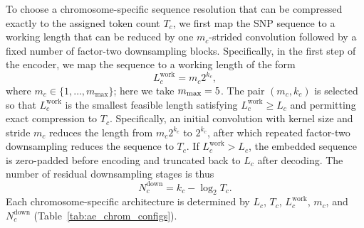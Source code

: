 \documentclass{article}
\begin{document}
To choose a chromosome-specific sequence resolution that can be compressed exactly to the assigned token count \(T_c\), we first map the SNP sequence to a working length that can be reduced by one \(m_c\)-strided convolution followed by a fixed number of factor-two downsampling blocks. Specifically, in the first step of the encoder, we map the sequence to a working length of the form
\[
L_c^{\mathrm{work}} = m_c 2^{k_c},
\]
where \(m_c \in \{1,\ldots,m_{\max}\}\); here we take \(m_{\rm max} = 5\). 
The pair \((m_c,k_c)\) is selected so that \(L_c^{\mathrm{work}}\) is the smallest feasible length satisfying \(L_c^{\mathrm{work}}\ge L_c\) and permitting exact compression to \(T_c\). Specifically, an initial convolution with kernel size and stride \(m_c\) reduces the length from \(m_c2^{k_c}\) to \(2^{k_c}\), after which repeated factor-two downsampling reduces the sequence to \(T_c\). If \(L_c^{\mathrm{work}}>L_c\), the embedded sequence is zero-padded before encoding and truncated back to \(L_c\) after decoding. The number of residual downsampling stages is thus
\[
N_c^{\mathrm{down}} = k_c-\log_2 T_c.
\]
Each chromosome-specific architecture is determined by \(L_c\), \(T_c\), \(L_c^{\mathrm{work}}\), \(m_c\), and \(N_c^{\mathrm{down}}\) (Table~\ref{tab:ae_chrom_configs}).
\end{document}
